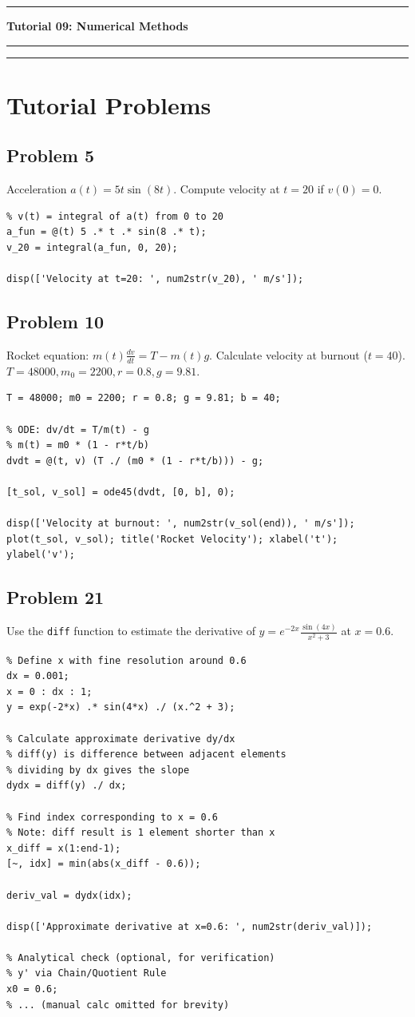 \documentclass[DIN, pagenumber=false, fontsize=11pt, parskip=half]{scrartcl}
\newcommand{\mypart}[1]{\vspace{1cm}\hrule\vspace{0.5cm}\noindent\textbf{\LARGE #1}\vspace{0.5cm}\hrule\vspace{1cm}}
\newcommand{\myproblem}[1]{\subsection*{#1}}
\begin{document}
\newpage
\label{tut9}
\mypart{Tutorial 09: Numerical Methods}



\vspace{1cm}
\hrule
\vspace{0.5cm}	
\section*{Tutorial Problems}

\myproblem{Problem 5}
Acceleration $a(t)=5t \sin(8t)$. Compute velocity at $t=20$ if $v(0)=0$.

\begin{lstlisting}
% v(t) = integral of a(t) from 0 to 20
a_fun = @(t) 5 .* t .* sin(8 .* t);
v_20 = integral(a_fun, 0, 20);

disp(['Velocity at t=20: ', num2str(v_20), ' m/s']);
\end{lstlisting}

\myproblem{Problem 10}
Rocket equation: $m(t)\frac{dv}{dt}=T-m(t)g$. Calculate velocity at burnout ($t=40$). $T=48000, m_0=2200, r=0.8, g=9.81$.

\begin{lstlisting}
T = 48000; m0 = 2200; r = 0.8; g = 9.81; b = 40;

% ODE: dv/dt = T/m(t) - g
% m(t) = m0 * (1 - r*t/b)
dvdt = @(t, v) (T ./ (m0 * (1 - r*t/b))) - g;

[t_sol, v_sol] = ode45(dvdt, [0, b], 0);

disp(['Velocity at burnout: ', num2str(v_sol(end)), ' m/s']);
plot(t_sol, v_sol); title('Rocket Velocity'); xlabel('t'); ylabel('v');
\end{lstlisting}

\myproblem{Problem 21}
Use the \texttt{diff} function to estimate the derivative of $y=e^{-2x}\frac{\sin(4x)}{x^{2}+3}$ at $x=0.6$.

\begin{lstlisting}
% Define x with fine resolution around 0.6
dx = 0.001;
x = 0 : dx : 1;
y = exp(-2*x) .* sin(4*x) ./ (x.^2 + 3);

% Calculate approximate derivative dy/dx
% diff(y) is difference between adjacent elements
% dividing by dx gives the slope
dydx = diff(y) ./ dx;

% Find index corresponding to x = 0.6
% Note: diff result is 1 element shorter than x
x_diff = x(1:end-1); 
[~, idx] = min(abs(x_diff - 0.6));

deriv_val = dydx(idx);

disp(['Approximate derivative at x=0.6: ', num2str(deriv_val)]);

% Analytical check (optional, for verification)
% y' via Chain/Quotient Rule
x0 = 0.6;
% ... (manual calc omitted for brevity)
\end{lstlisting}
\end{document}
